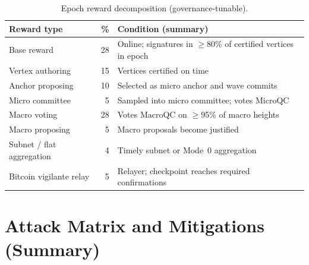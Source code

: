 \documentclass[11pt,a4paper,twoside]{report}
\theoremstyle{definition}
\begin{document}
\begin{table}[htbp]
  \centering
  \caption{Epoch reward decomposition (governance-tunable).}
  \begin{tabular}{@{}l r p{7.5cm}@{}}
    \toprule
    \textbf{Reward type} & \textbf{\%} & \textbf{Condition (summary)} \\
    \midrule
    Base reward & 28 & Online; signatures in $\geq$80\% of certified vertices in epoch \\
    Vertex authoring & 15 & Vertices certified on time \\
    Anchor proposing & 10 & Selected as micro anchor and wave commits \\
    Micro committee & 5 & Sampled into micro committee; votes MicroQC \\
    Macro voting & 28 & Votes MacroQC on $\geq$95\% of macro heights \\
    Macro proposing & 5 & Macro proposals become justified \\
    Subnet / flat aggregation & 4 & Timely subnet or Mode~0 aggregation \\
    Bitcoin vigilante relay & 5 & Relayer; checkpoint reaches required confirmations \\
    \bottomrule
  \end{tabular}
\end{table}

\chapter{Attack Matrix and Mitigations (Summary)}
\label{app:attacks}
\end{document}
